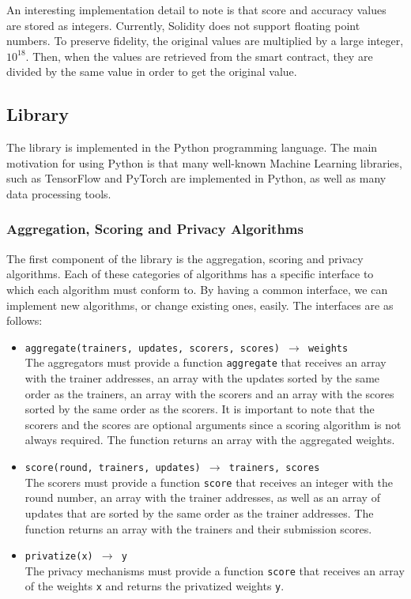 An interesting implementation detail to note is that score and accuracy values are stored as integers. Currently, Solidity does not support floating point numbers. To preserve fidelity, the original values are multiplied by a large integer, $10^{18}$. Then, when the values are retrieved from the smart contract, they are divided by the same value in order to get the original value.

\subsection{Library}

The library is implemented in the Python \cite{10.5555/1593511} programming language. The main motivation for using Python is that many well-known Machine Learning libraries, such as TensorFlow \cite{tensorflow2015-whitepaper} and PyTorch \cite{NEURIPS2019_9015} are implemented in Python, as well as many data processing tools.

\subsubsection{Aggregation, Scoring and Privacy Algorithms}

The first component of the library is the aggregation, scoring and privacy algorithms. Each of these categories of algorithms has a specific interface to which each algorithm must conform to. By having a common interface, we can implement new algorithms, or change existing ones, easily. The interfaces are as follows:

\begin{itemize}
    \item \texttt{aggregate(trainers, updates, scorers, scores) $\rightarrow$ weights}\\
    The aggregators must provide a function \texttt{aggregate} that receives an array with the trainer addresses, an array with the updates sorted by the same order as the trainers, an array with the scorers and an array with the scores sorted by the same order as the scorers. It is important to note that the scorers and the scores are optional arguments since a scoring algorithm is not always required. The function returns an array with the aggregated weights. %
    
    \item \texttt{score(round, trainers, updates) $\rightarrow$ trainers, scores}\\
    The scorers must provide a function \texttt{score} that receives an integer with the round number, an array with the trainer addresses, as well as an array of updates that are sorted by the same order as the trainer addresses. The function returns an array with the trainers and their submission scores. %
    
    \item \texttt{privatize(x) $\rightarrow$ y}\\
    The privacy mechanisms must provide a function \texttt{score} that receives an array of the weights \texttt{x} and returns the privatized weights \texttt{y}. %
\end{itemize}

